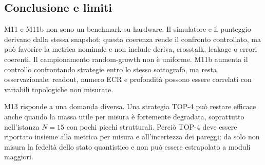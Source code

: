 \begin{onehalfspace}
\subsection{Conclusione e limiti}
\label{sec:app_comp_conclusione}

M11 e M11b non sono un benchmark su hardware. Il simulatore e il punteggio derivano dalla stessa snapshot; questa coerenza rende il confronto controllato, ma pu\`o favorire la metrica nominale e non include deriva, crosstalk, leakage o errori coerenti. Il campionamento random-growth non \`e uniforme. M11b aumenta il controllo confrontando strategie entro lo stesso sottografo, ma resta osservazionale: readout, numero ECR e profondit\`a possono essere correlati con variabili topologiche non misurate.

M13 risponde a una domanda diversa. Una strategia TOP-4 pu\`o restare efficace anche quando la massa utile per misura \`e fortemente degradata, soprattutto nell'istanza $N=15$ con pochi picchi strutturali. Perci\`o TOP-4 deve essere riportato insieme alla metrica per misura e all'incertezza dei pareggi; da solo non misura la fedelt\`a dello stato quantistico e non pu\`o essere estrapolato a moduli maggiori.

\end{onehalfspace}
